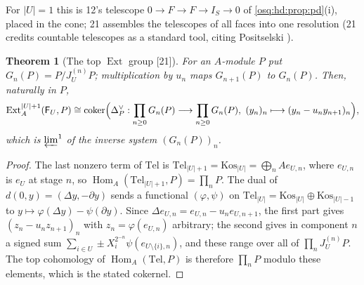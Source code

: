 \documentclass[11pt,letterpaper]{article}
\numberwithin{equation}{section}
\newtheorem{theorem}{Theorem}[section]
\theoremstyle{definition}
\theoremstyle{remark}
\theoremstyle{plain}
\newcommand{\Hom}{\operatorname{Hom}}
\newcommand{\Ext}{\operatorname{Ext}}
\newcommand{\src}[1]{\textup{\textsf{[#1]}}}
\begin{document}
For $|U|=1$ this is 12's telescope $0\to F\to F\to I_S\to0$ of \cref{osq:hd:prop:pd}(i), placed in the cone; 21 assembles the telescopes of
all faces into one resolution (21 credits countable telescopes as a standard tool, citing Positselski \cite{Positselski}).

\begin{theorem}[The top $\Ext$ group \src{21}]\label{osq:da:thm:ext}
For an $A$-module $P$ put $G_n(P)=P/J^{(n)}_UP$; multiplication by $u_n$ maps $G_{n+1}(P)$ to $G_n(P)$. Then, naturally in $P$,
\[
 \Ext^{|U|+1}_A(\mathsf F_U,P)\cong\operatorname{coker}\Bigl(\Delta^\vee_P:\prod_{n\ge0}G_n(P)\longrightarrow\prod_{n\ge0}G_n(P),\
 (y_n)_n\longmapsto(y_n-u_ny_{n+1})_n\Bigr),
\]
which is $\varprojlim^1$ of the inverse system $(G_n(P))_n$.
\end{theorem}
\begin{proof}
The last nonzero term of $\mathrm{Tel}$ is $\mathrm{Tel}_{|U|+1}=\mathrm{Kos}_{|U|}=\bigoplus_nAe_{U,n}$, where $e_{U,n}$ is $e_U$ at stage $n$,
so $\Hom_A(\mathrm{Tel}_{|U|+1},P)=\prod_nP$. The dual of $d(0,y)=(\Delta y,-\partial y)$ sends a functional $(\varphi,\psi)$ on
$\mathrm{Tel}_{|U|}=\mathrm{Kos}_{|U|}\oplus\mathrm{Kos}_{|U|-1}$ to $y\mapsto\varphi(\Delta y)-\psi(\partial y)$. Since
$\Delta e_{U,n}=e_{U,n}-u_ne_{U,n+1}$, the first part gives $(z_n-u_nz_{n+1})_n$ with $z_n=\varphi(e_{U,n})$ arbitrary; the second gives in
component $n$ a signed sum $\sum_{i\in U}\pm X_i^{2^{-n}}\psi(e_{U\setminus\{i\},n})$, and these range over all of $\prod_nJ^{(n)}_UP$. The
top cohomology of $\Hom_A(\mathrm{Tel},P)$ is therefore $\prod_nP$ modulo these elements, which is the stated cokernel.
\end{proof}
\end{document}
